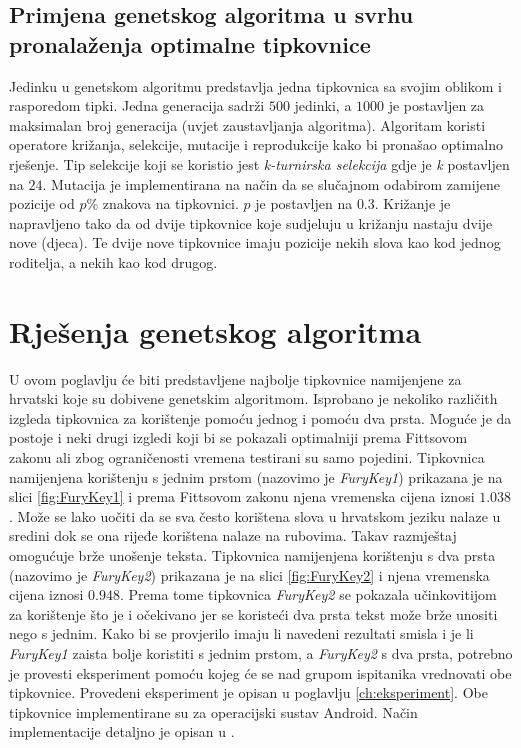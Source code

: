 \documentclass[times, utf8, zavrsni, numeric]{fer}
\begin{document}
\subsection{Primjena genetskog algoritma u svrhu pronalaženja optimalne tipkovnice}
Jedinku u genetskom algoritmu predstavlja jedna tipkovnica sa svojim oblikom i rasporedom tipki. Jedna generacija sadrži $500$ jedinki, a $1000$ je postavljen za maksimalan broj generacija (uvjet zaustavljanja algoritma). Algoritam koristi operatore križanja, selekcije, mutacije i reprodukcije kako bi pronašao optimalno rješenje. Tip selekcije koji se koristio jest \emph{k-turnirska selekcija} gdje je \emph{k} postavljen na $24$. Mutacija je implementirana na način da se slučajnom odabirom zamijene pozicije od $p\%$ znakova na tipkovnici. $p$ je postavljen na $0.3$. Križanje je napravljeno tako da od dvije tipkovnice koje sudjeluju u križanju nastaju dvije nove (djeca). Te dvije nove tipkovnice imaju pozicije nekih slova kao kod jednog roditelja, a nekih kao kod drugog.

\section{Rješenja genetskog algoritma}
U ovom poglavlju će biti predstavljene najbolje tipkovnice namijenjene za hrvatski koje su dobivene genetskim algoritmom. Isprobano je nekoliko različith izgleda  tipkovnica za korištenje pomoću jednog i pomoću dva prsta. Moguće je da postoje i neki drugi izgledi koji bi se pokazali optimalniji prema Fittsovom zakonu ali zbog ograničenosti vremena testirani su samo pojedini. Tipkovnica namijenjena korištenju s jednim prstom (nazovimo je \emph{FuryKey1}) prikazana je na slici \ref{fig:FuryKey1} i prema Fittsovom zakonu njena vremenska cijena iznosi $1.038$. Može se lako uočiti da se sva često korištena slova u hrvatskom jeziku nalaze u sredini dok se ona rijeđe korištena nalaze na rubovima. Takav razmještaj omogućuje brže unošenje teksta. Tipkovnica namijenjena korištenju s dva prsta (nazovimo je \emph{FuryKey2}) prikazana je na slici \ref{fig:FuryKey2} i njena vremenska cijena iznosi $0.948$. Prema tome tipkovnica \emph{FuryKey2} se pokazala učinkovitijom za korištenje što je i očekivano jer se koristeći dva prsta tekst može brže unositi nego s jednim. Kako bi se provjerilo imaju li navedeni rezultati smisla i je li \emph{FuryKey1} zaista bolje koristiti s jednim prstom, a \emph{FuryKey2} s dva prsta, potrebno je provesti eksperiment pomoću kojeg će se nad grupom ispitanika vrednovati obe tipkovnice. Provedeni eksperiment je opisan u poglavlju \ref{ch:eksperiment}. Obe tipkovnice implementirane su za operacijski sustav Android. Način implementacije detaljno je opisan u \cite{android_keyboard}.
\end{document}
